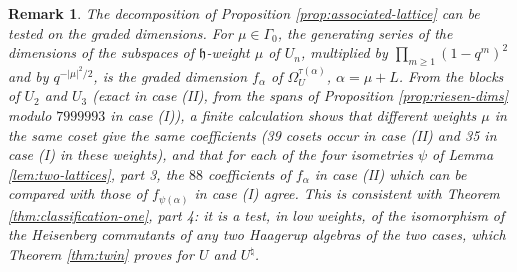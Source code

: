 \documentclass[leqno]{article}
\renewcommand{\geq}{\ensuremath{\geqslant}}
\newtheorem{remark}[thm]{Remark}
\numberwithin{equation}{section}
\begin{document}
\begin{remark}\normalfont
\label{rem:genus-characters}
The decomposition of Proposition \ref{prop:associated-lattice} can be tested on the graded dimensions. For $\mu \in \Gamma_0$, the generating series of the dimensions of the subspaces of $\mathfrak h$-weight $\mu$ of $U_n$, multiplied by $\prod_{m \geq 1}(1-q^m)^2$ and by $q^{-|\mu|^2/2}$, is the graded dimension $f_\alpha$ of $\Omega_U^{\tau(\alpha)}$, $\alpha = \mu+L$. From the blocks of $U_2$ and $U_3$ (exact in case (II), from the spans of Proposition \ref{prop:riesen-dims} modulo $7999993$ in case (I)), a finite calculation shows that different weights $\mu$ in the same coset give the same coefficients (39 cosets occur in case (II) and 35 in case (I) in these weights), and that for each of the four isometries $\psi$ of Lemma \ref{lem:two-lattices}, part 3, the $88$ coefficients of $f_\alpha$ in case (II) which can be compared with those of $f_{\psi(\alpha)}$ in case (I) agree. This is consistent with Theorem \ref{thm:classification-one}, part 4: it is a test, in low weights, of the isomorphism of the Heisenberg commutants of any two Haagerup algebras of the two cases, which Theorem \ref{thm:twin} proves for $U$ and $U^\natural$.
\end{remark}
\end{document}
